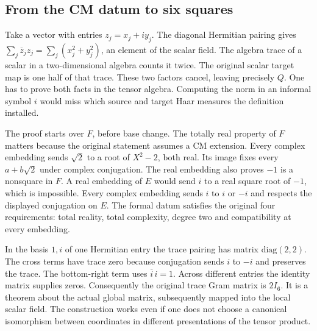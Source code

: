 \documentclass[12pt,letterpaper]{article}
\begin{document}
\subsection{From the CM datum to six squares}
Take a vector with entries $z_j=x_j+iy_j$. The diagonal Hermitian pairing gives $\sum_j\overline z_jz_j=\sum_j(x_j^2+y_j^2)$, an element of the scalar field. The algebra trace of a scalar in a two-dimensional algebra counts it twice. The original scalar target map is one half of that trace. These two factors cancel, leaving precisely $Q$. One has to prove both facts in the tensor algebra. Computing the norm in an informal symbol $i$ would miss which source and target Haar measures the definition installed.
\par
The proof starts over $F$, before base change. The totally real property of $F$ matters because the original statement assumes a CM extension. Every complex embedding sends $\sqrt2$ to a root of $X^2-2$, both real. Its image fixes every $a+b\sqrt2$ under complex conjugation. The real embedding also proves $-1$ is a nonsquare in $F$. A real embedding of $E$ would send $i$ to a real square root of $-1$, which is impossible. Every complex embedding sends $i$ to $i$ or $-i$ and respects the displayed conjugation on $E$. The formal datum satisfies the original four requirements: total reality, total complexity, degree two and compatibility at every embedding.
\par
In the basis $1,i$ of one Hermitian entry the trace pairing has matrix $\mathrm{diag}(2,2)$. The cross terms have trace zero because conjugation sends $i$ to $-i$ and preserves the trace. The bottom-right term uses $\overline i\,i=1$. Across different entries the identity matrix supplies zeros. Consequently the original trace Gram matrix is $2I_6$. It is a theorem about the actual global matrix, subsequently mapped into the local scalar field. The construction works even if one does not choose a canonical isomorphism between coordinates in different presentations of the tensor product.
\end{document}
